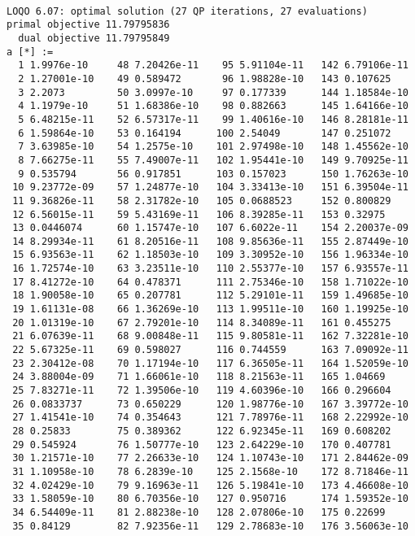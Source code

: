 \documentclass{article}
\begin{document}
\begin{verbatim}

LOQO 6.07: optimal solution (27 QP iterations, 27 evaluations)
primal objective 11.79795836
  dual objective 11.79795849
a [*] :=
  1 1.9976e-10     48 7.20426e-11    95 5.91104e-11   142 6.79106e-11
  2 1.27001e-10    49 0.589472       96 1.98828e-10   143 0.107625
  3 2.2073         50 3.0997e-10     97 0.177339      144 1.18584e-10
  4 1.1979e-10     51 1.68386e-10    98 0.882663      145 1.64166e-10
  5 6.48215e-11    52 6.57317e-11    99 1.40616e-10   146 8.28181e-11
  6 1.59864e-10    53 0.164194      100 2.54049       147 0.251072
  7 3.63985e-10    54 1.2575e-10    101 2.97498e-10   148 1.45562e-10
  8 7.66275e-11    55 7.49007e-11   102 1.95441e-10   149 9.70925e-11
  9 0.535794       56 0.917851      103 0.157023      150 1.76263e-10
 10 9.23772e-09    57 1.24877e-10   104 3.33413e-10   151 6.39504e-11
 11 9.36826e-11    58 2.31782e-10   105 0.0688523     152 0.800829
 12 6.56015e-11    59 5.43169e-11   106 8.39285e-11   153 0.32975
 13 0.0446074      60 1.15747e-10   107 6.6022e-11    154 2.20037e-09
 14 8.29934e-11    61 8.20516e-11   108 9.85636e-11   155 2.87449e-10
 15 6.93563e-11    62 1.18503e-10   109 3.30952e-10   156 1.96334e-10
 16 1.72574e-10    63 3.23511e-10   110 2.55377e-10   157 6.93557e-11
 17 8.41272e-10    64 0.478371      111 2.75346e-10   158 1.71022e-10
 18 1.90058e-10    65 0.207781      112 5.29101e-11   159 1.49685e-10
 19 1.61131e-08    66 1.36269e-10   113 1.99511e-10   160 1.19925e-10
 20 1.01319e-10    67 2.79201e-10   114 8.34089e-11   161 0.455275
 21 6.07639e-11    68 9.00848e-11   115 9.80581e-11   162 7.32281e-10
 22 5.67325e-11    69 0.598027      116 0.744559      163 7.09092e-11
 23 2.30412e-08    70 1.17194e-10   117 6.36505e-11   164 1.52059e-10
 24 3.88004e-09    71 1.66061e-10   118 8.21563e-11   165 1.04669
 25 7.83271e-11    72 1.39506e-10   119 4.60396e-10   166 0.296604
 26 0.0833737      73 0.650229      120 1.98776e-10   167 3.39772e-10
 27 1.41541e-10    74 0.354643      121 7.78976e-11   168 2.22992e-10
 28 0.25833        75 0.389362      122 6.92345e-11   169 0.608202
 29 0.545924       76 1.50777e-10   123 2.64229e-10   170 0.407781
 30 1.21571e-10    77 2.26633e-10   124 1.10743e-10   171 2.84462e-09
 31 1.10958e-10    78 6.2839e-10    125 2.1568e-10    172 8.71846e-11
 32 4.02429e-10    79 9.16963e-11   126 5.19841e-10   173 4.46608e-10
 33 1.58059e-10    80 6.70356e-10   127 0.950716      174 1.59352e-10
 34 6.54409e-11    81 2.88238e-10   128 2.07806e-10   175 0.22699
 35 0.84129        82 7.92356e-11   129 2.78683e-10   176 3.56063e-10

\end{verbatim}
\end{document}
